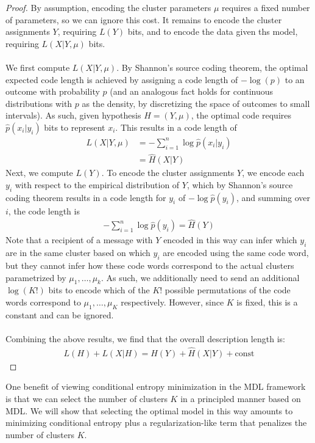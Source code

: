 \documentclass{article} %
\begin{document}
\begin{proof}
By assumption, encoding the cluster parameters $\mu$ requires a fixed number of parameters, so we can ignore this cost. It remains to encode the cluster assignments $Y$, requiring $L(Y)$ bits, and to encode the data given ths model, requiring $L(X|Y,\mu)$ bits. \\\\
We first compute $L(X|Y,\mu)$. By Shannon's source coding theorem, the optimal expected code length is achieved by assigning a code length of $-\log(p)$ to an outcome with probability $p$ (and an analogous fact holds for continuous distributions with $p$ as the density, by discretizing the space of outcomes to small intervals). As such, given hypothesis $H = (Y, \mu)$, the optimal code requires $\hat{p}(x_i | y_i)$ bits to represent $x_i$. This results in a code length of
\begin{align*}
L(X|Y,\mu) &= -\sum_{i=1}^n \log \hat{p}(x_i | y_i) \\
&= \hat{H}(X|Y)
\end{align*}
Next, we compute $L(Y)$. To encode the cluster assignments $Y$, we encode each $y_i$ with respect to the empirical distribution of $Y$, which by Shannon's source coding theorem results in a code length for $y_i$ of $-\log \hat{p}(y_i)$, and summing over $i$, the code length is
\begin{align*}
-\sum_{i=1}^n \log \hat{p}(y_i) = \hat{H}(Y)
\end{align*}
Note that a recipient of a message with $Y$ encoded in this way can infer which $y_i$ are in the same cluster based on which $y_i$ are encoded using the same code word, but they cannot infer how these code words correspond to the actual clusters parametrized by $\mu_1, \dots, \mu_k$. As such, we additionally need to send an additional $\log(K!)$ bits to encode which of the $K!$ possible permutations of the code words correspond to $\mu_1, \dots, \mu_K$ respectively. However, since $K$ is fixed, this is a constant and can be ignored.\\\\
Combining the above results, we find that the overall description length is:
\begin{align*}
L(H) + L(X|H) = \hat{H}(Y) + \hat{H}(X|Y) + \text{const}
\end{align*}
\end{proof}
One benefit of viewing conditional entropy minimization in the MDL framework is that we can select the number of clusters $K$ in a principled manner based on MDL. We will show that selecting the optimal model in this way amounts to minimizing conditional entropy plus a regularization-like term that penalizes the number of clusters $K$.\\\\
\end{document}
